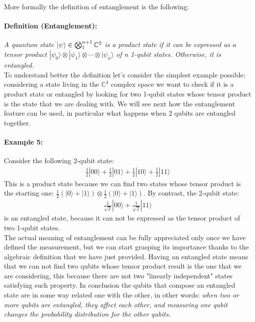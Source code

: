 \documentclass[english]{article}
\newcommand{\sbigotimes}{%
	\mathop{\mathchoice{\textstyle\bigotimes}{\bigotimes}{\bigotimes}{\bigotimes}}%
}
\begin{document}
				More formally the definition of entanglement is the following:
				
				\paragraph{Definition (Entanglement):} \emph{A quantum state $|\psi\rangle \in \sbigotimes_1^{n+1} \mathbb{C}^{2}$ is a product state if it can be expressed as a tensor product $|\psi_0\rangle \otimes |\psi_1\rangle \otimes \cdots \otimes |\psi_n\rangle$ of n 1-qubit states. Otherwise, it is entangled.} \\
				
				To understand better the definition let's consider the simplest example possible: considering a state living in the $\mathbb{C}^4$ complex space we want to check if it is a product state or entangled by looking for two 1-qubit states whose tensor product is the state that we are dealing with. We will see next how the entanglement feature can be used, in particular what happens when 2 qubits are entangled together.
				
				\paragraph{Example 5:} {Consider the following 2-qubit state:
				\begin{align*}
					\frac{1}{2}|00\rangle+\frac{1}{2}|01\rangle+\frac{1}{2}|10\rangle+\frac{1}{2}|11\rangle
				\end{align*} 
				This is a product state because we can find two states whose tensor product is the starting one: $\frac{1}{2}(|0\rangle+|1\rangle)\otimes\frac{1}{2}(|0\rangle+|1\rangle)$. By contrast, the 2-qubit state:
				\begin{align*}
					\frac{1}{\sqrt{2}}|00\rangle+\frac{1}{\sqrt{2}}|11\rangle
				\end{align*}
				is an entangled state, because it can not be expressed as the tensor product of two 1-qubit states.} \\
			
				The actual meaning of entanglement can be fully appreciated only once we have defined the measurement, but we can start grasping its importance thanks to the algebraic definition that we have just provided. Having an entangled state means that we can not find two qubits whose tensor product result is the one that we are considering, this because there are not two "linearly independent" states satisfying such property. In conclusion the qubits that compose an entangled state are in some way related one with the other, in other words: \emph{when two or more qubits are entangled, they affect each other, and measuring one qubit changes the probability distribution for the other qubits.}
				
\end{document}
